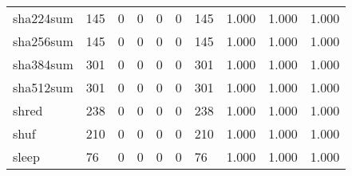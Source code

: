 \begin{longtable}{lp{1.3cm}p{1.3cm}p{1.3cm}p{1.3cm}p{1.3cm}p{1.3cm}p{1.3cm}p{1.3cm}p{1.3cm}}
sha224sum &                    145 &                                             0 &                                            0 &                                           0 &                                            0 &                                        145 &                                1.000 &                                  1.000 &                                1.000 \\
sha256sum &                    145 &                                             0 &                                            0 &                                           0 &                                            0 &                                        145 &                                1.000 &                                  1.000 &                                1.000 \\
sha384sum &                    301 &                                             0 &                                            0 &                                           0 &                                            0 &                                        301 &                                1.000 &                                  1.000 &                                1.000 \\
sha512sum &                    301 &                                             0 &                                            0 &                                           0 &                                            0 &                                        301 &                                1.000 &                                  1.000 &                                1.000 \\
shred     &                    238 &                                             0 &                                            0 &                                           0 &                                            0 &                                        238 &                                1.000 &                                  1.000 &                                1.000 \\
shuf      &                    210 &                                             0 &                                            0 &                                           0 &                                            0 &                                        210 &                                1.000 &                                  1.000 &                                1.000 \\
sleep     &                     76 &                                             0 &                                            0 &                                           0 &                                            0 &                                         76 &                                1.000 &                                  1.000 &                                1.000 \\

\end{longtable}
